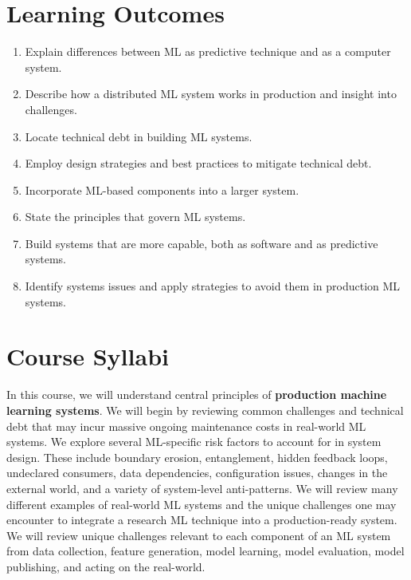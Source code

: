 \documentclass[11pt]{article}
\begin{document}
\section*{Learning Outcomes}
\begin{enumerate}
\item Explain differences between ML as predictive technique and as a computer system.

\item Describe how a distributed ML system works in production and insight into challenges.

\item Locate technical debt in building ML systems.

\item Employ design strategies and best practices to mitigate technical debt.

\item Incorporate ML-based components into a larger system.


\item State the principles that govern ML systems.

\item Build systems that are more capable, both as software and as predictive systems.

\item Identify systems issues and apply strategies to avoid them in production ML systems.

\end{enumerate}


\section*{Course Syllabi}

In this course, we will understand central principles of \textbf{production machine learning systems}. We will begin by reviewing common challenges and technical debt that may incur massive ongoing maintenance costs in real-world ML systems. We explore several ML-specific risk factors to account for in system design. These include boundary erosion, entanglement, hidden feedback loops, undeclared consumers, data dependencies, configuration issues, changes in the external world, and a variety of system-level anti-patterns. We will review many different examples of real-world ML systems and the unique challenges one may encounter to integrate a research ML technique into a production-ready system. We will review unique challenges relevant to each component of an ML system from data collection, feature generation, model learning, model evaluation, model publishing, and acting on the real-world. 
\end{document}
